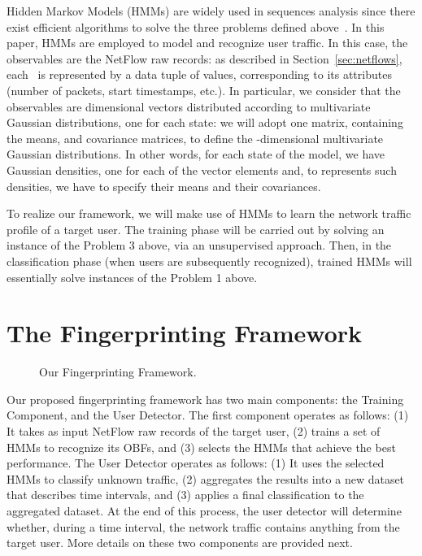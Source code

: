 \documentclass[10pt,conference,compsocconf,letterpaper]{IEEEtran}
\begin{document}
Hidden Markov Models (HMMs) are widely used in
sequences analysis since there exist efficient algorithms to solve the three problems defined 
above~\cite{Durbin98biologicalsequence,Jurafsky,sphinx}.  In this paper, HMMs
are employed to model and recognize user traffic. In this case, the observables are the NetFlow raw
records: as described in Section~\ref{sec:netflows}, each \nfr\ is
represented by a data tuple of  values, corresponding to its
 attributes (number of packets, start timestamps, etc.). In
particular, we consider that the observables are  dimensional
vectors distributed according to  multivariate Gaussian
distributions, one for each state: we will adopt one 
matrix, containing the means, and  covariance matrices, to define
the -dimensional multivariate Gaussian distributions. In other words, for each
state of the model, we have  Gaussian densities, one for each of the
 vector elements and, to represents such densities, we have to
specify their means and their covariances.

To realize our framework, we will make use of HMMs to learn the network traffic 
profile of a target user. The training phase will be carried out 
by solving an instance of the Problem 3 above, via an unsupervised 
approach. Then, in the classification phase (when users are subsequently recognized), 
trained HMMs will essentially solve instances of the Problem 1 above. 

\section{The Fingerprinting Framework}\label{sec:profiling-framework}
\label{sec:framework}

\begin{figure*}[ht]
  \centering \hfill
  \hfill
  \hfill
      \caption{Our Fingerprinting Framework.}
\end{figure*}


Our proposed fingerprinting framework has two main components: the
Training Component, and the User Detector. 
The first component operates as follows: (1) It takes as input NetFlow raw records of the target
user, (2) trains a set of HMMs to recognize its OBFs, and (3) selects the HMMs
that achieve the best performance. 
The User Detector operates as follows: (1) It uses the 
selected HMMs to classify unknown traffic, (2) aggregates the results into a
new dataset that describes time intervals, and (3) applies a final classification
to the aggregated dataset. At the end of this process, the user detector
will determine whether, during a time interval,  the network traffic contains
anything from the target user. 
More details on these two components are provided next.
\end{document}
